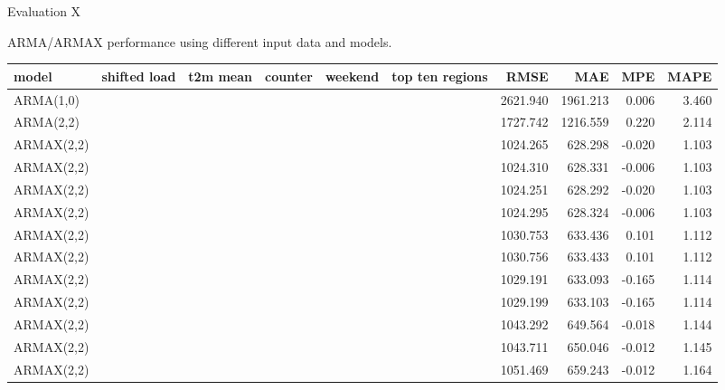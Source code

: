 \documentclass[t,xcolor={table},fleqn]{beamer}
\newcommand{\cmark}{\color{darkgreen}\ding{51}}%
\newcommand{\xmark}{\color{darkred}\ding{55}}%
\begin{document}
\begin{frame}{Evaluation X}

ARMA/ARMAX performance using different input data and models. %

\begin{table}[!ht]%
\centering
\tiny
\begin{tabularx}{\linewidth}{Xlllllrrrr}
\textbf{model} & \textbf{shifted load} & \textbf{t2m mean} & \textbf{counter} & \textbf{weekend} & \textbf{top ten regions} & \textbf{RMSE} & \textbf{MAE} & \textbf{MPE} & \textbf{MAPE}\\\hline
ARMA(1,0) & \xmark & \xmark & \xmark & \xmark & \xmark & 2621.940 & 1961.213 & 0.006 & 3.460\\
ARMA(2,2) & \xmark & \xmark & \xmark & \xmark & \xmark & 1727.742 & 1216.559 & 0.220 & 2.114\\
ARMAX(2,2) & \cmark & \cmark & \xmark & \xmark & \xmark & 1024.265 & 628.298 & -0.020 & \cellcolor{green!35}1.103\\
ARMAX(2,2) & \cmark & \cmark & \cmark & \xmark & \xmark & 1024.310 & 628.331 & -0.006 & \cellcolor{green!35}1.103\\
ARMAX(2,2) & \cmark & \cmark & \xmark & \cmark & \xmark & \cellcolor{green!35}1024.251 & \cellcolor{green!35}628.292 & -0.020 & \cellcolor{green!35}1.103\\
ARMAX(2,2) & \cmark & \cmark & \cmark & \cmark & \xmark & 1024.295 & 628.324 & -0.006 & \cellcolor{green!35}1.103\\
ARMAX(2,2) & \cmark & \xmark & \xmark & \xmark & \xmark & 1030.753 & 633.436 & 0.101 & 1.112\\
ARMAX(2,2) & \cmark & \xmark & \xmark & \cmark & \xmark & 1030.756 & 633.433 & 0.101 & 1.112\\
ARMAX(2,2) & \cmark & \xmark & \cmark & \xmark & \xmark & 1029.191 & 633.093 & -0.165 & 1.114\\
ARMAX(2,2) & \cmark & \xmark & \cmark & \cmark & \xmark & 1029.199 & 633.103 & -0.165 & 1.114\\
ARMAX(2,2) & \cmark & \xmark & \xmark & \xmark & \cmark & 1043.292 & 649.564 & -0.018 & 1.144\\
ARMAX(2,2) & \cmark & \xmark & \cmark & \xmark & \cmark & 1043.711 & 650.046 & -0.012 & 1.145\\
ARMAX(2,2) & \cmark & \xmark & \cmark & \cmark & \cmark & 1051.469 & 659.243 & -0.012 & 1.164\\

\end{tabularx}
\end{table}
\end{frame}
\end{document}
